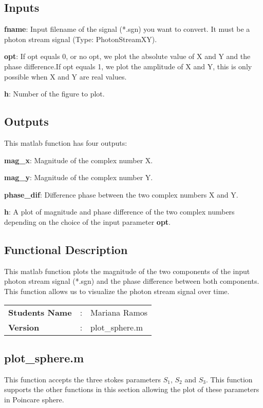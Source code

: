 \subsection*{Inputs}
\indent

\textbf{fname}: Input filename of the signal (*.sgn) you want to convert. It must be a photon stream signal (Type: PhotonStreamXY).
\bigskip

\textbf{opt}: If opt equals 0, or no opt, we plot the absolute value of X and Y and the phase difference.If opt equals 1, we plot the amplitude of X and Y, this is only possible when X and Y are real values.
\bigskip

\textbf{h}: Number of the figure to plot.


\subsection*{Outputs}
This matlab function has four outputs:
\bigskip

\textbf{mag\_x}: Magnitude of the complex number X.
\bigskip

\textbf{mag\_y}: Magnitude of the complex number Y.
\bigskip

\textbf{phase\_dif}: Difference phase between the two complex numbers X and Y.
\bigskip

\textbf{h}: A plot of magnitude and phase difference of the two complex numbers depending on the choice of the input parameter \textbf{opt}.


\subsection*{Functional Description}
This matlab function plots the magnitude of the two components of the input photon stream signal (*.sgn) and the phase difference between both components. This function allows us to visualize the photon stream signal over time.

\begin{tcolorbox}	
	\begin{tabular}{p{2.75cm} p{0.2cm} p{10.5cm}} 	
		\textbf{Students Name}  &:& Mariana Ramos\\
		\textbf{Version}        &:& plot\_sphere.m
	\end{tabular}
\end{tcolorbox}
\subsection{plot\_sphere.m}

This function accepts the three stokes parameters $S_1$, $S_2$ and $S_3$. This function supports the other functions in this section allowing the plot of these parameters in Poincare sphere.


%
